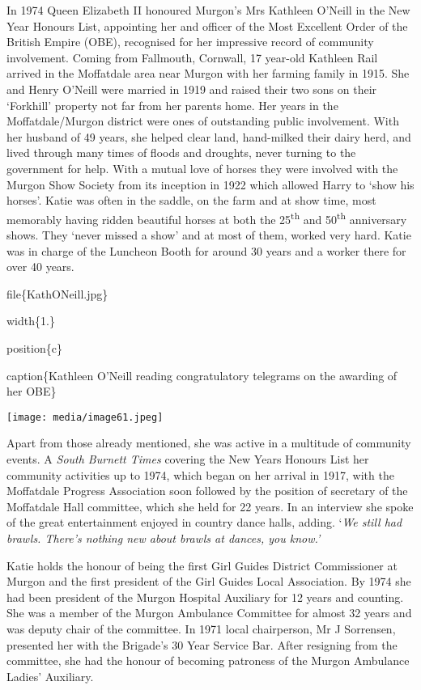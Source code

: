 In 1974 Queen Elizabeth II honoured Murgon's Mrs Kathleen O'Neill in the New Year Honours List, appointing her and officer of the Most Excellent Order of the British Empire (OBE), recognised for her impressive record of community involvement. Coming from Fallmouth, Cornwall, 17 year-old Kathleen Rail arrived in the Moffatdale area near Murgon with her farming family in 1915. She and Henry O'Neill were married in 1919 and raised their two sons on their `Forkhill' property not far from her parents home. Her years in the Moffatdale/Murgon district were ones of outstanding public involvement. With her husband of 49 years, she helped clear land, hand-milked their dairy herd, and lived through many times of floods and droughts, never turning to the government for help. With a mutual love of horses they were involved with the Murgon Show Society from its inception in 1922 which allowed Harry to `show his horses'. Katie was often in the saddle, on the farm and at show time, most memorably having ridden beautiful horses at both the 25\textsuperscript{th} and 50\textsuperscript{th} anniversary shows. They `never missed a show' and at most of them, worked very hard. Katie was in charge of the Luncheon Booth for around 30 years and a worker there for over 40 years.

file\{KathONeill.jpg\}

width\{1.\}

position\{c\}

caption\{Kathleen O'Neill reading congratulatory telegrams on the awarding of her OBE\}

\texttt{[image: media/image61.jpeg]}

Apart from those already mentioned, she was active in a multitude of community events. A \emph{South Burnett Times} covering the New Years Honours List her community activities up to 1974, which began on her arrival in 1917, with the Moffatdale Progress Association soon followed by the position of secretary of the Moffatdale Hall committee, which she held for 22 years. In an interview she spoke of the great entertainment enjoyed in country dance halls, adding. `\emph{We still had brawls. There's nothing new about brawls at dances, you know.'}

Katie holds the honour of being the first Girl Guides District Commissioner at Murgon and the first president of the Girl Guides Local Association. By 1974 she had been president of the Murgon Hospital Auxiliary for 12 years and counting. She was a member of the Murgon Ambulance Committee for almost 32 years and was deputy chair of the committee. In 1971 local chairperson, Mr J Sorrensen, presented her with the Brigade's 30 Year Service Bar. After resigning from the committee, she had the honour of becoming patroness of the Murgon Ambulance Ladies' Auxiliary.

